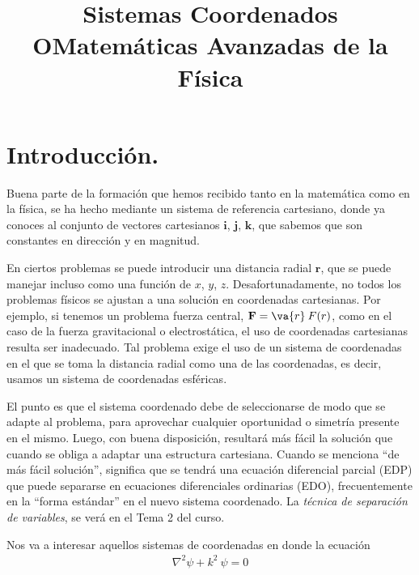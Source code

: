  
\title{Sistemas Coordenados \\ {\large OMatemáticas Avanzadas de la Física}\vspace{-1.5\baselineskip}}
\date{ }
\author{}

\renewcommand\labelenumii{\theenumi.{\arabic{enumii}}}
\maketitle
\fontsize{14}{14}\selectfont
\section{Introducción.}
Buena parte de la formación que hemos recibido tanto en la matemática como en la física, se ha hecho mediante un sistema de referencia cartesiano, donde ya conoces al conjunto de vectores cartesianos $\mathbf{i}$, $\mathbf{j}$, $\mathbf{k}$, que sabemos que son constantes en dirección y en magnitud. 
\par
En ciertos problemas se puede introducir una distancia radial $\mathbf{r}$, que se puede manejar incluso como una función de $x$, $y$, $z$. Desafortunadamente, no todos los problemas físicos se ajustan a una solución en coordenadas cartesianas. Por ejemplo, si tenemos un problema fuerza central, $\mathbf{F} = \va{r} \: F(r)$, como en el caso de la fuerza gravitacional o electrostática, el uso de coordenadas cartesianas resulta ser inadecuado. Tal problema exige el uso de un sistema de coordenadas en el que se toma la distancia radial como una de las coordenadas, es decir, usamos un sistema de coordenadas esféricas.
\par
El punto es que el sistema coordenado debe de seleccionarse de modo que se adapte al problema, para aprovechar cualquier oportunidad o simetría presente en el mismo. Luego, con buena disposición, resultará más fácil la solución que cuando se obliga a adaptar una estructura cartesiana. Cuando se menciona \enquote{de más fácil solución}, significa que se tendrá una ecuación diferencial parcial (EDP) que puede separarse en ecuaciones diferenciales ordinarias (EDO), frecuentemente en la \enquote{forma estándar} en el nuevo sistema coordenado. La \emph{técnica de separación de variables}, se verá en el Tema 2 del curso.
\par
Nos va a interesar aquellos sistemas de coordenadas en donde la ecuación
\begin{align}
\nabla^{2} \psi + k^{2} \: \psi = 0
\label{eq:ecuacion_02_01}
\end{align}
